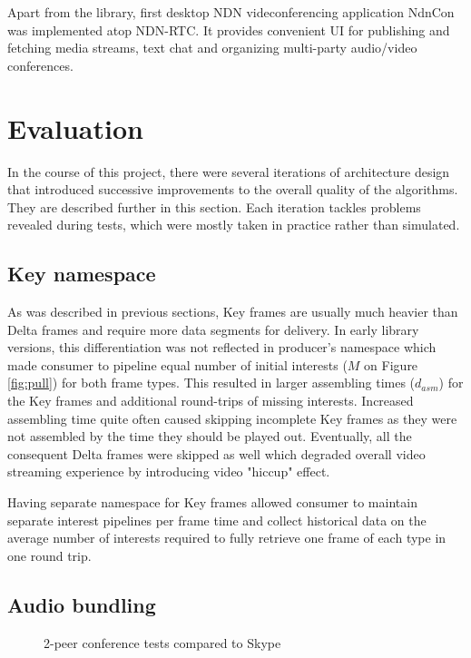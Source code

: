 \documentclass{icn/sig-alternate-2012} %
\newcommand{\ndnrtcName}{NDN-RTC} %
\newcommand{\ndnconName}{NdnCon}
\begin{document}
Apart from the library, first desktop NDN videconferencing application \ndnconName{} \cite{ndncon} was implemented atop \ndnrtcName{}. It provides convenient UI for publishing and fetching media streams, text chat and organizing multi-party audio/video conferences.

\section{Evaluation}
\label{sec:eval} 
In the course of this project, there were several iterations of architecture design that introduced successive improvements to the overall quality of the algorithms. They are described further in this section. Each iteration tackles problems revealed during tests, which were mostly taken in practice rather than simulated.

\subsection{Key namespace}
As was described in previous sections, Key frames are usually much heavier than Delta frames and require more data segments for delivery. In early library versions, this differentiation was not reflected in producer's namespace which made consumer to pipeline equal number of initial interests ($M$ on Figure \ref{fig:pull}) for both frame types. This resulted in larger assembling times ($d_{asm}$) for the Key frames and additional round-trips of missing interests. Increased assembling time quite often caused skipping incomplete Key frames as they were not assembled by the time they should be played out. Eventually, all the consequent Delta frames were skipped as well which degraded overall video streaming experience by introducing video "hiccup" effect.

Having separate namespace for Key frames allowed consumer to maintain separate interest pipelines per frame time and collect historical data on the average number of interests required to fully retrieve one frame of each type in one round trip.

\subsection{Audio bundling}
\begin{figure}[t!]
\centering
\begin{tiny}
\def\svgwidth{0.5\textwidth}
\end{tiny}
\vspace{-18pt}
\caption{2-peer conference tests compared to Skype}
\label{fig:tests-skype}
\end{figure}
\end{document}
